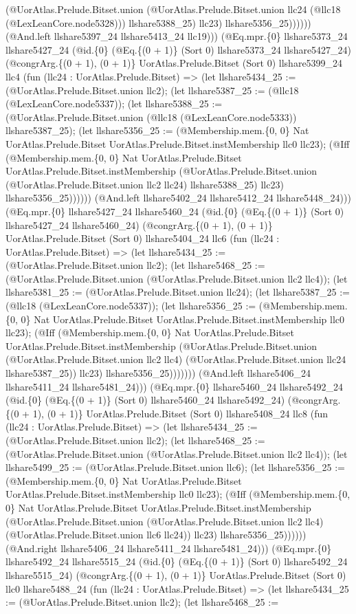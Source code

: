\documentclass[11pt]{article}
\begin{document}
(@UorAtlas.Prelude.Bitset.union (@UorAtlas.Prelude.Bitset.union llc24 (@llc18 (@LexLeanCore.node5328))) llshare5388\_25) llc23) llshare5356\_25)))))) (@And.left llshare5397\_24 llshare5413\_24 llc19))) (@Eq.mpr.\{0\} llshare5373\_24 llshare5427\_24 (@id.\{0\} (@Eq.\{(0 + 1)\} (Sort 0) llshare5373\_24 llshare5427\_24) (@congrArg.\{(0 + 1), (0 + 1)\} UorAtlas.Prelude.Bitset (Sort 0) llshare5399\_24 llc4 (fun (llc24 : UorAtlas.Prelude.Bitset) => (let llshare5434\_25 := (@UorAtlas.Prelude.Bitset.union llc2); (let llshare5387\_25 := (@llc18 (@LexLeanCore.node5337)); (let llshare5388\_25 := (@UorAtlas.Prelude.Bitset.union (@llc18 (@LexLeanCore.node5333)) llshare5387\_25); (let llshare5356\_25 := (@Membership.mem.\{0, 0\} Nat UorAtlas.Prelude.Bitset UorAtlas.Prelude.Bitset.instMembership llc0 llc23); (@Iff (@Membership.mem.\{0, 0\} Nat UorAtlas.Prelude.Bitset UorAtlas.Prelude.Bitset.instMembership (@UorAtlas.Prelude.Bitset.union (@UorAtlas.Prelude.Bitset.union llc2 llc24) llshare5388\_25) llc23) llshare5356\_25)))))) (@And.left llshare5402\_24 llshare5412\_24 llshare5448\_24))) (@Eq.mpr.\{0\} llshare5427\_24 llshare5460\_24 (@id.\{0\} (@Eq.\{(0 + 1)\} (Sort 0) llshare5427\_24 llshare5460\_24) (@congrArg.\{(0 + 1), (0 + 1)\} UorAtlas.Prelude.Bitset (Sort 0) llshare5404\_24 llc6 (fun (llc24 : UorAtlas.Prelude.Bitset) => (let llshare5434\_25 := (@UorAtlas.Prelude.Bitset.union llc2); (let llshare5468\_25 := (@UorAtlas.Prelude.Bitset.union (@UorAtlas.Prelude.Bitset.union llc2 llc4)); (let llshare5381\_25 := (@UorAtlas.Prelude.Bitset.union llc24); (let llshare5387\_25 := (@llc18 (@LexLeanCore.node5337)); (let llshare5356\_25 := (@Membership.mem.\{0, 0\} Nat UorAtlas.Prelude.Bitset UorAtlas.Prelude.Bitset.instMembership llc0 llc23); (@Iff (@Membership.mem.\{0, 0\} Nat UorAtlas.Prelude.Bitset UorAtlas.Prelude.Bitset.instMembership (@UorAtlas.Prelude.Bitset.union (@UorAtlas.Prelude.Bitset.union llc2 llc4) (@UorAtlas.Prelude.Bitset.union llc24 llshare5387\_25)) llc23) llshare5356\_25))))))) (@And.left llshare5406\_24 llshare5411\_24 llshare5481\_24))) (@Eq.mpr.\{0\} llshare5460\_24 llshare5492\_24 (@id.\{0\} (@Eq.\{(0 + 1)\} (Sort 0) llshare5460\_24 llshare5492\_24) (@congrArg.\{(0 + 1), (0 + 1)\} UorAtlas.Prelude.Bitset (Sort 0) llshare5408\_24 llc8 (fun (llc24 : UorAtlas.Prelude.Bitset) => (let llshare5434\_25 := (@UorAtlas.Prelude.Bitset.union llc2); (let llshare5468\_25 := (@UorAtlas.Prelude.Bitset.union (@UorAtlas.Prelude.Bitset.union llc2 llc4)); (let llshare5499\_25 := (@UorAtlas.Prelude.Bitset.union llc6); (let llshare5356\_25 := (@Membership.mem.\{0, 0\} Nat UorAtlas.Prelude.Bitset UorAtlas.Prelude.Bitset.instMembership llc0 llc23); (@Iff (@Membership.mem.\{0, 0\} Nat UorAtlas.Prelude.Bitset UorAtlas.Prelude.Bitset.instMembership (@UorAtlas.Prelude.Bitset.union (@UorAtlas.Prelude.Bitset.union llc2 llc4) (@UorAtlas.Prelude.Bitset.union llc6 llc24)) llc23) llshare5356\_25)))))) (@And.right llshare5406\_24 llshare5411\_24 llshare5481\_24))) (@Eq.mpr.\{0\} llshare5492\_24 llshare5515\_24 (@id.\{0\} (@Eq.\{(0 + 1)\} (Sort 0) llshare5492\_24 llshare5515\_24) (@congrArg.\{(0 + 1), (0 + 1)\} UorAtlas.Prelude.Bitset (Sort 0) llc0 llshare5488\_24 (fun (llc24 : UorAtlas.Prelude.Bitset) => (let llshare5434\_25 := (@UorAtlas.Prelude.Bitset.union llc2); (let llshare5468\_25 := 
\end{document}
